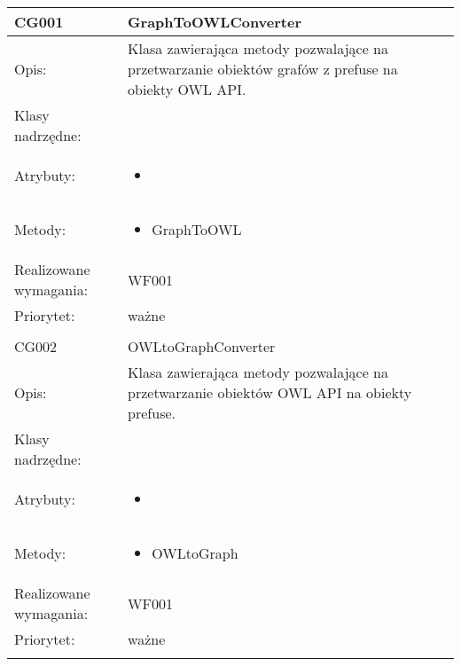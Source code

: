 \documentclass[a4paper,10pt]{article}
\begin{document}
\begin{center}
 


\begin{longtable}{|m{3cm}|m{9cm}|} \hline

CG001 & GraphToOWLConverter \\ \hline
Opis: & Klasa zawierająca metody pozwalające na przetwarzanie obiektów grafów z prefuse na obiekty OWL API. \\ \hline
Klasy nadrzędne: &     \\ \hline
Atrybuty: & \begin{itemize}
 \item 
\end{itemize}
 \\ \hline
Metody: & \begin{itemize}
 \item GraphToOWL
\end{itemize}
  \\ \hline
Realizowane wymagania: & WF001 \\ \hline
Priorytet: & ważne  \\ \hline

\multicolumn{2}{c}{} \\
 \hline

CG002 & OWLtoGraphConverter \\ \hline
Opis: & Klasa zawierająca metody pozwalające na przetwarzanie obiektów OWL API na obiekty prefuse. \\ \hline
Klasy nadrzędne: &     \\ \hline
Atrybuty: & \begin{itemize}
 \item 
\end{itemize}
 \\ \hline
Metody: & \begin{itemize}
 \item OWLtoGraph
\end{itemize}
  \\ \hline
Realizowane wymagania: & WF001 \\ \hline
Priorytet: & ważne  \\ \hline

\multicolumn{2}{c}{} \\
 \hline


\end{longtable}

\end{center}


\clearpage
{}
{}

\end{document}
